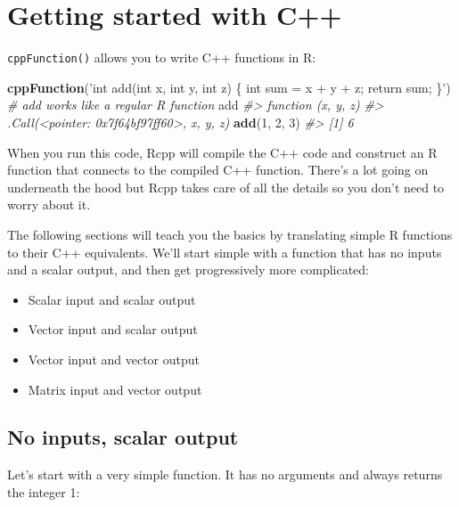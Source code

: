 \documentclass[]{book}
\makeatletter
\newenvironment{Shaded}{\begin{snugshade}}{\end{snugshade}}
\newcommand{\CommentTok}[1]{\textcolor[rgb]{0.37,0.37,0.37}{\textit{#1}}}
\newcommand{\DecValTok}[1]{\textcolor[rgb]{0.06,0.06,0.06}{#1}}
\newcommand{\KeywordTok}[1]{\textcolor[rgb]{0.27,0.27,0.27}{\textbf{#1}}}
\newcommand{\NormalTok}[1]{#1}
\newcommand{\StringTok}[1]{\textcolor[rgb]{0.5,0.5,0.5}{#1}}
\providecommand{\tightlist}{%
  \setlength{\itemsep}{0pt}\setlength{\parskip}{0pt}}
\newcommand{\indexc}[1]{\index{#1@\texttt{#1}}}
\makeatother
\begin{document}
\hypertarget{rcpp-intro}{%
\section{Getting started with C++}\label{rcpp-intro}}

\texttt{cppFunction()} allows you to write C++ functions in R: \indexc{cppFunction()}

\begin{Shaded}
\begin{Highlighting}[]
\KeywordTok{cppFunction}\NormalTok{(}\StringTok{'int add(int x, int y, int z) \{}
\StringTok{  int sum = x + y + z;}
\StringTok{  return sum;}
\StringTok{\}'}\NormalTok{)}
\CommentTok{# add works like a regular R function}
\NormalTok{add}
\CommentTok{#> function (x, y, z) }
\CommentTok{#> .Call(<pointer: 0x7f64bf97ff60>, x, y, z)}
\KeywordTok{add}\NormalTok{(}\DecValTok{1}\NormalTok{, }\DecValTok{2}\NormalTok{, }\DecValTok{3}\NormalTok{)}
\CommentTok{#> [1] 6}
\end{Highlighting}
\end{Shaded}

When you run this code, Rcpp will compile the C++ code and construct an R function that connects to the compiled C++ function. There's a lot going on underneath the hood but Rcpp takes care of all the details so you don't need to worry about it.

The following sections will teach you the basics by translating simple R functions to their C++ equivalents. We'll start simple with a function that has no inputs and a scalar output, and then get progressively more complicated:

\begin{itemize}
\tightlist
\item
  Scalar input and scalar output
\item
  Vector input and scalar output
\item
  Vector input and vector output
\item
  Matrix input and vector output
\end{itemize}

\hypertarget{no-inputs-scalar-output}{%
\subsection{No inputs, scalar output}\label{no-inputs-scalar-output}}

Let's start with a very simple function. It has no arguments and always returns the integer 1:
\end{document}
